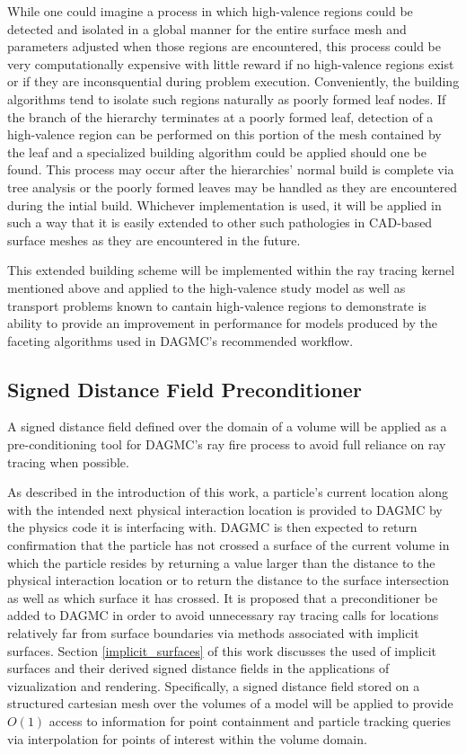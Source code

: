\documentclass[12pt, a4paper]{article}
\begin{document}
While one could imagine a process in which high-valence regions could be detected and isolated in a global manner for the entire surface mesh and parameters adjusted when those regions are encountered, this process could be very computationally expensive with little reward if no high-valence regions exist or if they are inconsquential during problem execution. Conveniently, the building algorithms tend to isolate such regions naturally as poorly formed leaf nodes. If the branch of the hierarchy terminates at a poorly formed leaf, detection of a high-valence region can be performed on this portion of the mesh contained by the leaf and a specialized building algorithm could be applied should one be found. This process may occur after the hierarchies' normal build is complete via tree analysis or the poorly formed leaves may be handled as they are encountered during the intial build. Whichever implementation is used, it will be applied in such a way that it is easily extended to other such pathologies in CAD-based surface meshes as they are encountered in the future.

This extended building scheme will be implemented within the ray tracing kernel mentioned above and applied to the high-valence study model as well as transport problems known to cantain high-valence regions to demonstrate is ability to provide an improvement in performance for models produced by the faceting algorithms used in DAGMC's recommended workflow.

\subsection{Signed Distance Field Preconditioner}

A signed distance field defined over the domain of a volume will be applied as a pre-conditioning tool for DAGMC's ray fire process to avoid full reliance on ray tracing when possible.

As described in the introduction of this work, a particle's current location along with the intended next physical interaction location is provided to DAGMC by the physics code it is interfacing with. DAGMC is then expected to return confirmation that the particle has not crossed a surface of the current volume in which the particle resides by returning a value larger than the distance to the physical interaction location or to return the distance to the surface intersection as well as which surface it has crossed. It is proposed that a preconditioner be added to DAGMC in order to avoid unnecessary ray tracing calls for locations relatively far from surface boundaries via methods associated with implicit surfaces. Section \ref{implicit_surfaces} of this work discusses the used of implicit surfaces and their derived signed distance fields in the applications of vizualization and rendering. Specifically, a signed distance field stored on a structured cartesian mesh over the volumes of a model will be applied to provide $O(1)$ access to information for point containment and particle tracking queries via interpolation for points of interest within the volume domain.
\end{document}
